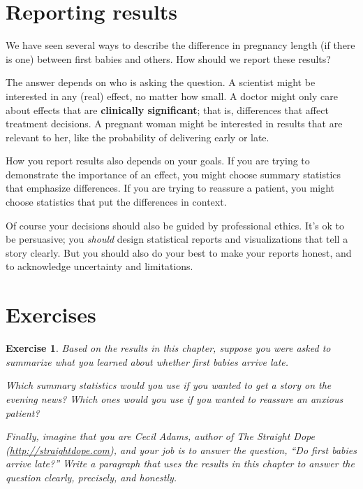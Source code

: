\documentclass[12pt]{book}
\theoremstyle{exercise}
\newtheorem{exercise}{Exercise}[chapter]
\begin{document}
\section{Reporting results}

We have seen several ways to describe the difference in pregnancy
length (if there is one) between first babies and others.  How should
we report these results?%

The answer depends on who is asking the question.  A scientist might
be interested in any (real) effect, no matter how small.  A doctor
might only care about effects that are {\bf clinically significant};
that is, differences that affect treatment decisions.  A pregnant
woman might be interested in results that are relevant to her, like
the probability of delivering early or late.%
%

How you report results also depends on your goals.  If you are trying
to demonstrate the importance of an effect, you might choose summary
statistics that emphasize differences.  If you are trying to reassure
a patient, you might choose statistics that put the differences in
context.

Of course your decisions should also be guided by professional ethics.
It's ok to be persuasive; you {\em should\/} design statistical reports
and visualizations that tell a story clearly.  But you should also do
your best to make your reports honest, and to acknowledge uncertainty
and limitations.%


\section{Exercises}

\begin{exercise}
Based on the results in this chapter, suppose you were asked to
summarize what you learned about whether first babies arrive late.

Which summary statistics would you use if you wanted to get a story
on the evening news?  Which ones would you use if you wanted to
reassure an anxious patient?%
%

Finally, imagine that you are Cecil Adams, author of {\it The Straight
  Dope\/} (\url{http://straightdope.com}), and your job is to answer the
question, ``Do first babies arrive late?''  Write a paragraph that
uses the results in this chapter to answer the question clearly,
precisely, and honestly.%

\end{exercise}
\end{document}
